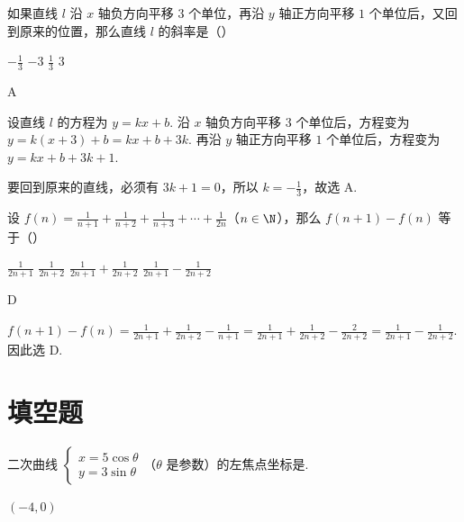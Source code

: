 \documentclass[UTF8,a4paper,oneside,11pt]{ctexbook}
\begin{document}
\begin{problem}
如果直线 \(l\) 沿 \(x\) 轴负方向平移 \(3\) 个单位，再沿 \(y\) 轴正方向平移 \(1\) 个单位后，又回到原来的位置，那么直线 \(l\) 的斜率是（\quad）

\choices
    {\(-\frac{1}{3}\)}
    {\(-3\)}
    {\(\frac{1}{3}\)}
    {\(3\)}
\end{problem}

\begin{answer}
A
\end{answer}

\begin{solution}
设直线 \(l\) 的方程为 \(y=kx+b\). 沿 \(x\) 轴负方向平移 \(3\) 个单位后，方程变为
\(y=k(x+3)+b=kx+b+3k\). 再沿 \(y\) 轴正方向平移 \(1\) 个单位后，方程变为 \(y=kx+b+3k+1\).

要回到原来的直线，必须有 \(3k+1=0\)，所以 \(k=-\frac{1}{3}\)，故选 A.
\end{solution}

\begin{problem}
设 \(f(n)=\frac{1}{n+1}+\frac{1}{n+2}+\frac{1}{n+3}+\cdots+\frac{1}{2n}\)（\(n \in \N\)），那么 \(f(n+1)-f(n)\) 等于（\quad）

\choices
    {\(\frac{1}{2n+1}\)}
    {\(\frac{1}{2n+2}\)}
    {\(\frac{1}{2n+1}+\frac{1}{2n+2}\)}
    {\(\frac{1}{2n+1}-\frac{1}{2n+2}\)}
\end{problem}

\begin{answer}
D
\end{answer}

\begin{solution}
\(f(n+1)-f(n)=\frac{1}{2n+1}+\frac{1}{2n+2}-\frac{1}{n+1}=\frac{1}{2n+1}+\frac{1}{2n+2}-\frac{2}{2n+2}=\frac{1}{2n+1}-\frac{1}{2n+2}\).
因此选 D.
\end{solution}

\section{填空题}

\begin{problem}
二次曲线 \(\begin{cases}
x = 5\cos \theta\\
y = 3\sin \theta
\end{cases}\)（\(\theta\) 是参数）的左焦点坐标是\fillinblank{}.
\end{problem}

\begin{answer}
\((-4,0)\)
\end{answer}
\end{document}
